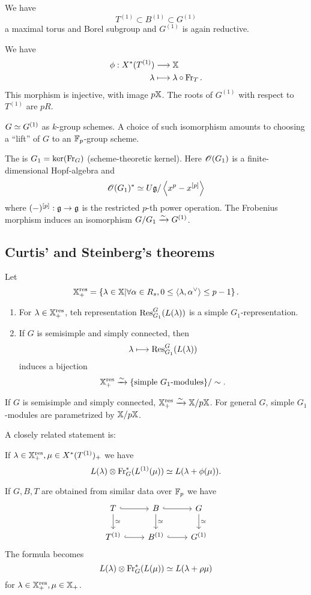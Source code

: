 		We have
		\[
			T^{(1)} \subset B^{(1)}\subset G^{(1)}
		\]
		a maximal torus and Borel subgroup and $G^{(1)}$ is again reductive.

		We have
		\begin{align*}
			\phi: X^{*}(T^{(1)}) &\longrightarrow \mathbb{X} \\
			\lambda &\longmapsto \lambda\circ\operatorname{Fr}_T.
		\end{align*}
		This morphism is injective, with image $p\mathbb{X}$. The roots of $G^{(1)}$ with respect to
		$T^{(1)}$ are $pR$.
		\begin{remark}
			$G\simeq G^{(1)}$ as $k$-group schemes. A choice of such isomorphism amounts to
			choosing a ``lift'' of $G$ to an $\mathbb{F}_p$-group scheme.
		\end{remark}
		The  is $G_1=\operatorname{ker}(\operatorname{Fr}_G)$ (scheme-theoretic kernel). Here
		$\mathscr{O}(G_1)$ is a finite-dimensional Hopf-algebra and
		\[
			\mathscr{O}(G_1)^{*} \simeq U\mathfrak g / \left<x^{p} - x^{[p]} \right>
		\]
		where $(-)^{[p]}:\kg\to \kg$ is the restricted $p$-th power operation. The Frobenius
		morphism induces an isomorphism $G /G_1\xrightarrow{\sim} G^{(1)}$.

		\subsection{Curtis' and Steinberg's theorems}
		Let
		\[
			\mathbb{X}_+^{\mathrm{res}} = \left\{ \lambda\in \mathbb{X} \middle| \forall \alpha \in R_s, 0\le
			\left<\lambda,\alpha ^{\vee} \right>\le p-1 \right\} .	
		\]
		\begin{theorem}[Curtis]\leavevmode
			\begin{enumerate}[(1)]
				\item For $\lambda\in \mathbb{X}_+^{\mathrm{res}}$, teh representation $\operatorname{Res}_{G_1}^{G}(L(\lambda))$ is
					a simple $G_1$-representation.
				\item If $G$ is semisimple and simply connected, then
					\[
						\lambda\mapsto \Res_{G_1}^{G}(L(\lambda))
					\]
					induces a bijection
					\[
						\mathbb{X}_+^{\mathrm{res}}\xrightarrow{\sim} \{\text{simple }G_1\text{-modules}\} /\sim.
					\]
			\end{enumerate}
		\end{theorem}
		\begin{remark}
			If $G$ is semisimple and simply connected, $\mathbb{X}_+^{\mathrm{res}}\xrightarrow{\sim} \mathbb{X} /p\mathbb{X}$. For general
			$G$, simple $G_1$-modules are parametrized by $\mathbb{X} /p\mathbb{X}$.
		\end{remark}
		A closely related statement is:
		\begin{theorem}[Steinberg]
			If $\lambda\in \mathbb{X}_+^{\mathrm{res}}, \mu\in X^{*}(T^{(1)})_+$ we have
			\[
				L(\lambda)\otimes \operatorname{Fr}_G^{*}(L^{(1)}(\mu)) \simeq L(\lambda+\phi(\mu)).
			\] 	
		\end{theorem}
		If $G,B,T$ are obtained from similar data over $\mathbb{F}_p$ we have
		\[
			\begin{tikzcd}
				T \ar[r,hook] \ar[d,"\isoto"] & B \ar[r,hook] \ar[d,"\isoto"] & G \ar[d,"\isoto"] \\
				T^{(1)} \ar[r,hook] & B^{(1)} \ar[r,hook] & G^{(1)}
			\end{tikzcd}
		\]
		The formula becomes
		\[
			L(\lambda) \otimes \operatorname{Fr}_G^{*}(L(\mu)) \simeq L(\lambda+\rho\mu)
		\]
		for $\lambda\in \mathbb{X}_+^{\mathrm{res}}, \mu\in\mathbb{X}_{+}$.

